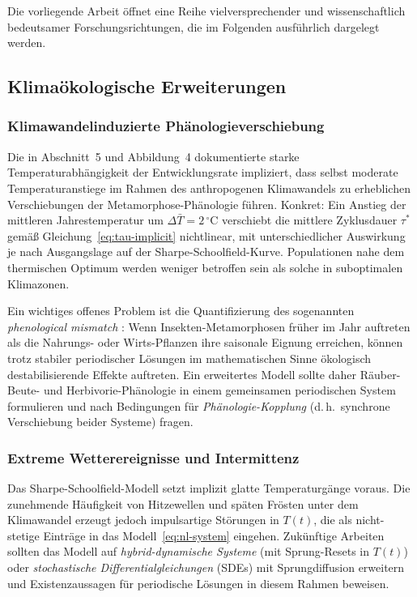 ﻿\documentclass[12pt, a4paper]{article}
\theoremstyle{definition}
\begin{document}
Die vorliegende Arbeit öffnet eine Reihe vielversprechender und wissenschaftlich
bedeutsamer Forschungsrichtungen, die im Folgenden ausführlich dargelegt werden.

\subsection{Klimaökologische Erweiterungen}

\subsubsection{Klimawandelinduzierte Phänologieverschiebung}
Die in Abschnitt~5 und Abbildung~4 dokumentierte starke Temperaturabhängigkeit
der Entwicklungsrate impliziert, dass selbst moderate Temperaturanstiege im Rahmen
des anthropogenen Klimawandels zu erheblichen Verschiebungen der Metamorphose-Phänologie
führen. Konkret: Ein Anstieg der mittleren Jahrestemperatur um $\Delta\bar{T} = 2\,^\circ$C
verschiebt die mittlere Zyklusdauer $\tau^*$ gemäß Gleichung~\eqref{eq:tau-implicit}
nichtlinear, mit unterschiedlicher Auswirkung je nach Ausgangslage auf der
Sharpe-Schoolfield-Kurve. Populationen nahe dem thermischen Optimum werden weniger
betroffen sein als solche in suboptimalen Klimazonen.

Ein wichtiges offenes Problem ist die Quantifizierung des sogenannten
\emph{phenological mismatch} \cite{Visser2005}: Wenn Insekten-Metamorphosen früher
im Jahr auftreten als die Nahrungs- oder Wirts-Pflanzen ihre saisonale Eignung
erreichen, können trotz stabiler periodischer Lösungen im mathematischen Sinne
ökologisch destabilisierende Effekte auftreten. Ein erweitertes Modell sollte
daher Räuber-Beute- und Herbivorie-Phänologie in einem gemeinsamen periodischen
System formulieren und nach Bedingungen für \emph{Phänologie-Kopplung} (d.\,h.\
synchrone Verschiebung beider Systeme) fragen.

\subsubsection{Extreme Wetterereignisse und Intermittenz}
Das Sharpe-Schoolfield-Modell setzt implizit glatte Temperaturgänge voraus.
Die zunehmende Häufigkeit von Hitzewellen und späten Frösten unter dem Klimawandel
erzeugt jedoch impulsartige Störungen in $T(t)$, die als nicht-stetige Einträge in
das Modell~\eqref{eq:nl-system} eingehen. Zukünftige Arbeiten sollten das Modell
auf \emph{hybrid-dynamische Systeme} (mit Sprung-Resets in $T(t)$) oder
\emph{stochastische Differentialgleichungen} (SDEs) mit Sprungdiffusion erweitern
und Existenzaussagen für periodische Lösungen in diesem Rahmen beweisen.
\end{document}
